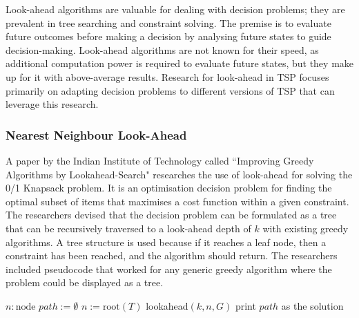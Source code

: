 Look-ahead algorithms are valuable for dealing with decision problems\cite{murthy1995lookahead}; they are prevalent in tree searching and constraint solving\cite{frost1995look}. The premise is to evaluate future outcomes before making a decision by analysing future states to guide decision-making\cite{DongLookahead}. Look-ahead algorithms are not known for their speed, as additional computation power is required to evaluate future states, but they make up for it with above-average results\cite{SARKAR19941}. Research for look-ahead in TSP focuses primarily on adapting decision problems to different versions of TSP that can leverage this research\cite{Lin1973}.

\subsubsection{Nearest Neighbour Look-Ahead}
\label{NN-Look-ahead}
A paper by the Indian Institute of Technology called ``Improving Greedy Algorithms by Lookahead-Search"\cite{SARKAR19941} researches the use of look-ahead for solving the 0/1 Knapsack problem\cite{martello1990knapsack}. It is an optimisation decision problem for finding the optimal subset of items that maximises a cost function within a given constraint. The researchers devised that the decision problem can be formulated as a tree that can be recursively traversed to a look-ahead depth of $k$ with existing greedy algorithms\cite{SARKAR19941}. A tree structure is used because if it reaches a leaf node, then a constraint has been reached, and the algorithm should return. The researchers included pseudocode that worked for any generic greedy algorithm where the problem could be displayed as a tree\cite{SARKAR19941}.

\renewcommand{\algorithmicrequire}{\textbf{Input:}}
\renewcommand{\algorithmicensure}{\textbf{Output:}}

\begin{algorithm}[H]
\caption{lookahead-search$(k : \text{integer}, T : \text{tree}, G : \text{greedy algorithm})$}
\begin{algorithmic}[1]
\State $n : \text{node}$
\State $path := \emptyset$
\State $n := \text{root}(T)$
\State lookahead$(k, n, G)$
\State print $path$ as the solution
\end{algorithmic}
\cite{SARKAR19941}
\end{algorithm}

